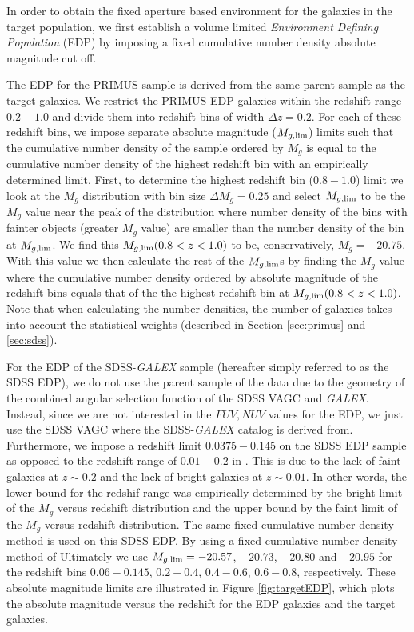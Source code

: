 \documentclass{emulateapj}
\begin{document}
In order to obtain the fixed aperture based environment for the galaxies in the target population, 
we first establish a volume limited {\it Environment Defining Population} (EDP) by imposing a fixed 
cumulative number density absolute magnitude cut off. 

The EDP for the PRIMUS sample is derived from the same parent sample as the target galaxies. 
We restrict the PRIMUS EDP galaxies within the redshift range $0.2-1.0$ and divide them into redshift bins of width $\Delta z = 0.2$. 
For each of these redshift bins, we impose separate absolute magnitude ($M_{g,\rm{lim}}$) limits such 
that the cumulative number density of the sample ordered by $M_{g}$ is equal to the cumulative 
number density of the highest redshift bin with an empirically determined limit. 
First, to determine the highest redshift bin ($0.8-1.0$) limit we look at the $M_{g}$ distribution with bin size
$\Delta M_{g} = 0.25$ and select $M_{g,\rm{lim}}$ to be the $M_{g}$ value near the peak of the 
distribution where number density of the bins with fainter objects (greater $M_{g}$ value) are smaller
than the number density of the bin at $M_{g, \rm{lim}}$. 
We find this $M_{g, \rm{lim}}( 0.8 < z < 1.0)$ to be, conservatively, $M_{g} = -20.75$. 
With this value we then calculate the rest of the $M_{g, \rm{lim}}$s by finding the
$M_{g}$ value where the cumulative number density ordered by absolute magnitude of the redshift bins 
equals that of the the highest redshift bin at $M_{g, \rm{lim}}( 0.8 < z < 1.0)$. 
Note that when calculating the number densities, the number of galaxies takes into account the 
statistical weights (described in Section \ref{sec:primus} and \ref{sec:sdss}).

For the EDP of the SDSS-{\em GALEX} sample (hereafter simply referred to as the SDSS EDP), 
we do not use the parent sample of the data due to 
the geometry of the combined angular selection function of the SDSS VAGC and {\em GALEX}. 
Instead, since we are not interested in the $FUV, NUV$ values for the EDP, we just use the
SDSS VAGC where the SDSS-{\em GALEX} catalog is derived from. 
Furthermore, we impose a redshift limit $0.0375-0.145$ on the SDSS EDP sample as opposed 
to the redshift range of $0.01-0.2$ in \cite{Moustakas:20133aa}.
This is due to the lack of faint galaxies at $z \sim 0.2$ and the lack of bright 
galaxies at $z \sim 0.01$. 
In other words, the lower bound for the redshif range was empirically determined by the bright limit of 
the $M_{g}$ versus redshift distribution and the upper bound by the faint limit of the 
$M_{g}$ versus redshift distribution. 
The same fixed cumulative number density method is used on this SDSS EDP. 
By using a fixed cumulative number density method of 
Ultimately we use $M_{g,\rm{lim}} = -20.57$, $-20.73$, $-20.80$ and $-20.95$ for the redshift bins 
$0.06-0.145$, $0.2-0.4$, $0.4-0.6$, $0.6-0.8$, respectively. 
These absolute magnitude limits are illustrated in Figure \ref{fig:targetEDP}, which plots the absolute magnitude versus the redshift for the EDP galaxies and the target galaxies. 
\end{document}
